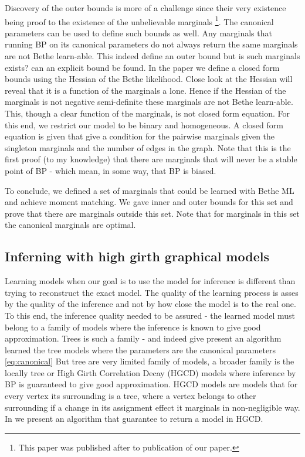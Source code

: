 {Discovery of the outer bounds is more of a challenge since their very existence being proof to the existence of the unbelievable marginals \cite{pitkow2011learning}\footnote{This paper was published after to publication of our paper.}.
The canonical parameters can be used to define such bounds as well.
Any marginals that running BP on its canonical parameters do not always return the same marginals are not Bethe learn-able.
This indeed define an outer bound but is such marginals exists? can an explicit bound be found.
In the paper we define a closed form bounds using the Hessian of the Bethe likelihood.
Close look at the Hessian will reveal that it is a function of the marginals a lone.
Hence if the Hessian of the marginals is not negative semi-definite these marginals are not Bethe learn-able.
This, though a clear function of the marginals, is not closed form equation.
For this end, we restrict our model to be binary and homogeneous. 
A closed form equation is given that give a condition for the pairwise marginals given the singleton marginals and the number of edges in the graph.
Note that this is the first proof (to my knowledge) that there are marginals that will never be a stable point of BP - which mean, in some way, that BP is biased.

To conclude, we defined a set of marginals that could be learned with Bethe ML and achieve moment matching.
We gave inner and outer bounds for this set and prove that there are marginals outside this set.
Note that for marginals in this set the canonical marginals are optimal.  

\subsection{Inferning with high girth graphical models}
Learning models when our goal is to use the model for inference is different than trying to reconstruct the exact model.
The quality of the learning process is asses by the quality of the inference and not by how close the model is to the real one.
To this end, the inference quality needed to be assured  - the learned  model must belong to a family of models where the inference is known to give good approximation.
Trees is such a family - and indeed \cite{chowLiu} give present an algorithm learned the tree models where the parameters are the canonical parameters \eqref{eq:canonical}
But tree are very limited family of models, a broader family is the locally tree or High Girth Correlation Decay (HGCD) models where inference by BP is guaranteed to give good approximation.
HGCD models are models that for every vertex its surrounding is a tree, where a vertex belongs to other surrounding if a change in its assignment effect it marginals in non-negligible way.
In \cite{heinemann2014inferning} we present an algorithm that guarantee to return a model in HGCD.

}
